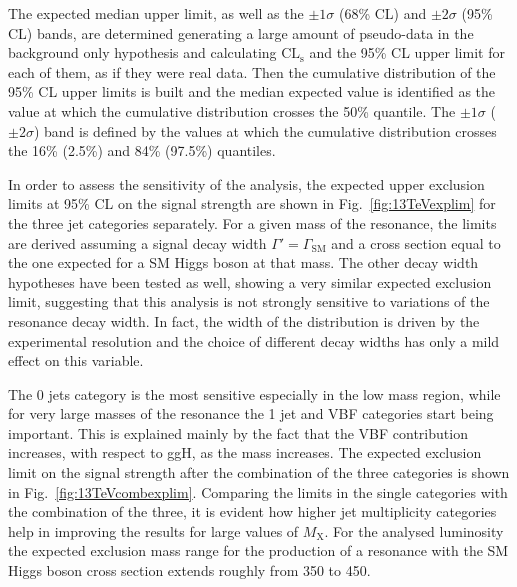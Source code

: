 The expected median upper limit, as well as the $\pm 1\sigma$ (68\% CL) and $\pm 2\sigma$ (95\% CL) bands, are determined generating a large amount of pseudo-data in the background only hypothesis and calculating $\mathrm{CL_s}$ and the 95\% CL upper limit for each of them, as if they were real data. Then the cumulative distribution of the 95\% CL upper limits is built and the median expected value is identified as the value at which the cumulative distribution crosses the 50\% quantile. The $\pm 1\sigma$ ($\pm 2 \sigma$) band is defined by the values at which the cumulative distribution crosses the 16\% (2.5\%) and 84\% (97.5\%) quantiles.

In order to assess the sensitivity of the analysis, the expected upper exclusion limits at 95\% CL on the signal strength are shown in Fig.~\ref{fig:13TeVexplim} for the three jet categories separately. For a given mass of the resonance, the limits are derived assuming a signal decay width $\Gamma' = \Gamma_\mathrm{SM}$ and a cross section equal to the one expected for a SM Higgs boson at that mass. The other decay width hypotheses have been tested as well, showing a very similar expected exclusion limit, suggesting that this analysis is not strongly sensitive to variations of the resonance decay width. In fact, the width of the \mti distribution is driven by the experimental resolution and the choice of different decay widths has only a mild effect on this variable.

The 0 jets category is the most sensitive especially in the low mass region, while for very large masses of the resonance the 1 jet and VBF categories start being important. This is explained mainly by the fact that the VBF contribution increases, with respect to ggH, as the mass increases. The expected exclusion limit on the signal strength after the combination of the three categories is shown in Fig.~\ref{fig:13TeVcombexplim}. Comparing the limits in the single categories with the combination of the three, it is evident how higher jet multiplicity categories help in improving the results for large values of $M_\mathrm{X}$. For the analysed luminosity the expected exclusion mass range for the production of a resonance with the SM Higgs boson cross section extends roughly from 350 to 450\GeV.

